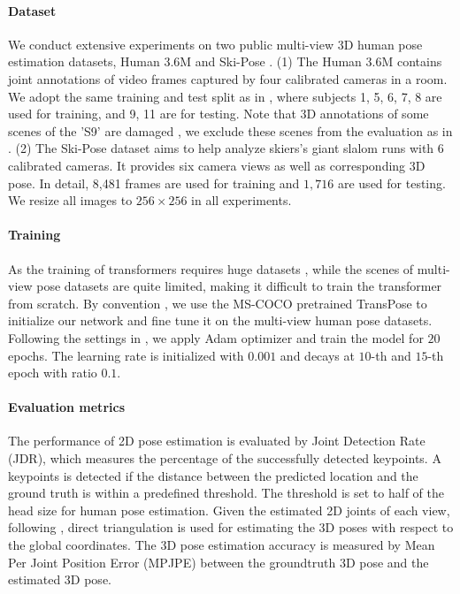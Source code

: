 \documentclass{bmvc2k}
\begin{document}
\paragraph{Dataset} 
We conduct extensive experiments on two public multi-view 3D human pose estimation datasets, Human 3.6M \cite{h36m_pami, IonescuSminchisescu11} and Ski-Pose \cite{sporri2016reasearch, rhodin2018learning, gilgien2013determination, gilgien2014effect, gilgien2015determination, fasel2016three, fasel2017joint}. 
(1) The Human 3.6M contains joint annotations of video frames captured by four calibrated cameras in a room. We adopt the same training and test split as in \cite{qiu2019cross, iskakov2019learnable, he2020epipolar}, where subjects 1, 5, 6, 7, 8 are used for training, and 9, 11 are for testing. 
Note that 3D annotations of some scenes of the ’S9’ are damaged \cite{iskakov2019learnable}, 
we exclude these scenes from the evaluation as in \cite{iskakov2019learnable, he2020epipolar}. 
(2) The Ski-Pose dataset aims to help analyze skiers's giant slalom runs with 6 calibrated cameras. It provides six camera views as well as corresponding 3D pose. 
In detail, 8,481 frames are used for training and $1,716$ are used for testing. 
We resize all images to $256 \times 256$ in all experiments. 


\vspace{-0.8em}
\paragraph{Training} 
As the training of transformers requires huge datasets \cite{vaswani2017attention, dosovitskiy2020image}, while the scenes of multi-view pose datasets are quite limited, making it difficult to train the transformer from scratch. 
By convention \cite{iskakov2019learnable, he2020epipolar}, 
we use the MS-COCO \cite{lin2014microsoft} pretrained TransPose \cite{yang2020transpose} to initialize our network and fine tune it on the multi-view human pose datasets. Following the settings in \cite{he2020epipolar}, we apply Adam optimizer \cite{kingma2014adam} and train the model for $20$ epochs. The learning rate is initialized with $0.001$ and decays at $10$-th and $15$-th epoch with ratio $0.1$. 


\vspace{-0.8em}
\paragraph{Evaluation metrics}
The performance of 2D pose estimation is evaluated by Joint Detection
Rate (JDR), which measures the percentage of the successfully detected keypoints. A keypoints is detected if the distance between the predicted location and the ground truth is within a predefined threshold. The threshold is set to half of the head size for human pose estimation. 
Given the estimated 2D joints of each view, following \cite{qiu2019cross, he2020epipolar}, direct triangulation is used for estimating the 3D poses with respect to the global coordinates. 
The 3D pose estimation accuracy is measured by Mean Per Joint Position Error (MPJPE) between the groundtruth 3D pose and the estimated 3D pose. 
\end{document}
